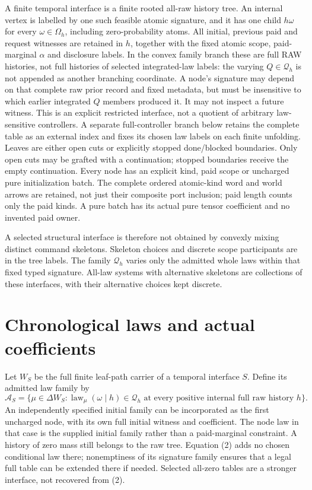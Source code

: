 \documentclass[11pt]{article}\usepackage{amsmath,amssymb,amsthm,geometry}\geometry{margin=1in}
\begin{document}
A finite temporal interface is a finite rooted all-raw history tree. An internal vertex is labelled by one such feasible atomic signature, and it has one child $h\omega$ for every $\omega\in\Omega_h$, including zero-probability atoms. All initial, previous paid and request witnesses are retained in $h$, together with the fixed atomic scope, paid-marginal $\alpha$ and disclosure labels. In the convex family branch these are full RAW histories, not full histories of selected integrated-law labels: the varying $Q\in\mathcal Q_h$ is not appended as another branching coordinate. A node's signature may depend on that complete raw prior record and fixed metadata, but must be insensitive to which earlier integrated $Q$ members produced it. It may not inspect a future witness. This is an explicit restricted interface, not a quotient of arbitrary law-sensitive controllers. A separate full-controller branch below retains the complete table as an external index and fixes its chosen law labels on each finite unfolding. Leaves are either open cuts or explicitly stopped done/blocked boundaries. Only open cuts may be grafted with a continuation; stopped boundaries receive the empty continuation. Every node has an explicit kind, paid scope or uncharged pure initialization batch. The complete ordered atomic-kind word and world arrows are retained, not just their composite port inclusion; paid length counts only the paid kinds. A pure batch has its actual pure tensor coefficient and no invented paid owner.

A selected structural interface is therefore not obtained by convexly mixing distinct command skeletons. Skeleton choices and discrete scope participants are in the tree labels. The family $\mathcal Q_h$ varies only the admitted whole laws within that fixed typed signature. All-law systems with alternative skeletons are collections of these interfaces, with their alternative choices kept discrete.

\section{Chronological laws and actual coefficients}
Let $W_S$ be the full finite leaf-path carrier of a temporal interface $S$. Define its admitted law family by
\[
 \mathcal A_S=\{\mu\in\Delta W_S:
    \operatorname{law}_\mu(\omega\mid h)\in\mathcal Q_h
    \text{ at every positive internal full raw history }h\}.             \tag{2}
\]
An independently specified initial family can be incorporated as the first uncharged node, with its own full initial witness and coefficient. The node law in that case is the supplied initial family rather than a paid-marginal constraint. A history of zero mass still belongs to the raw tree. Equation (2) adds no chosen conditional law there; nonemptiness of its signature family ensures that a legal full table can be extended there if needed. Selected all-zero tables are a stronger interface, not recovered from (2).
\end{document}
